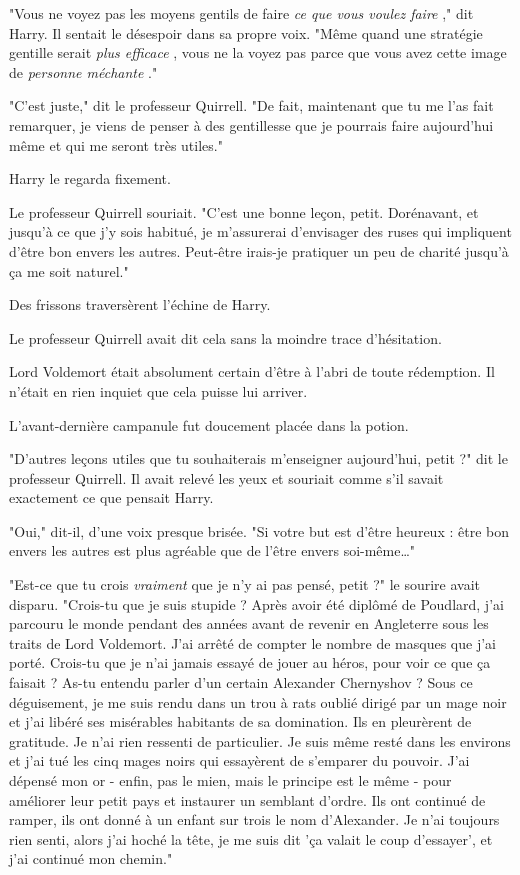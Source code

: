 "Vous ne voyez pas les moyens gentils de faire \emph{ce que vous voulez faire} ," dit Harry. Il sentait le désespoir dans sa propre voix. "Même quand une stratégie gentille serait \emph{plus efficace} , vous ne la voyez pas parce que vous avez cette image de \emph{personne méchante} ."

"C'est juste," dit le professeur Quirrell. "De fait, maintenant que tu me l'as fait remarquer, je viens de penser à des gentillesse que je pourrais faire aujourd'hui même et qui me seront très utiles."

Harry le regarda fixement.

Le professeur Quirrell souriait. "C'est une bonne leçon, petit. Dorénavant, et jusqu'à ce que j'y sois habitué, je m'assurerai d'envisager des ruses qui impliquent d'être bon envers les autres. Peut-être irais-je pratiquer un peu de charité jusqu'à ça me soit naturel."

Des frissons traversèrent l'échine de Harry.

Le professeur Quirrell avait dit cela sans la moindre trace d'hésitation.

Lord Voldemort était absolument certain d'être à l'abri de toute rédemption. Il n'était en rien inquiet que cela puisse lui arriver.

L'avant-dernière campanule fut doucement placée dans la potion.

"D'autres leçons utiles que tu souhaiterais m'enseigner aujourd'hui, petit ?" dit le professeur Quirrell. Il avait relevé les yeux et souriait comme s'il savait exactement ce que pensait Harry.

"Oui," dit-il, d'une voix presque brisée. "Si votre but est d'être heureux : être bon envers les autres est plus agréable que de l'être envers soi-même…"

"Est-ce que tu crois \emph{vraiment}  que je n'y ai pas pensé, petit ?" le sourire avait disparu. "Crois-tu que je suis stupide ? Après avoir été diplômé de Poudlard, j'ai parcouru le monde pendant des années avant de revenir en Angleterre sous les traits de Lord Voldemort. J'ai arrêté de compter le nombre de masques que j'ai porté. Crois-tu que je n'ai jamais essayé de jouer au héros, pour voir ce que ça faisait ? As-tu entendu parler d'un certain Alexander Chernyshov ? Sous ce déguisement, je me suis rendu dans un trou à rats oublié dirigé par un mage noir et j'ai libéré ses misérables habitants de sa domination. Ils en pleurèrent de gratitude. Je n'ai rien ressenti de particulier. Je suis même resté dans les environs et j'ai tué les cinq mages noirs qui essayèrent de s'emparer du pouvoir. J'ai dépensé mon or - enfin, pas le mien, mais le principe est le même - pour améliorer leur petit pays et instaurer un semblant d'ordre. Ils ont continué de ramper, ils ont donné à un enfant sur trois le nom d'Alexander. Je n'ai toujours rien senti, alors j'ai hoché la tête, je me suis dit 'ça valait le coup d'essayer', et j'ai continué mon chemin."

